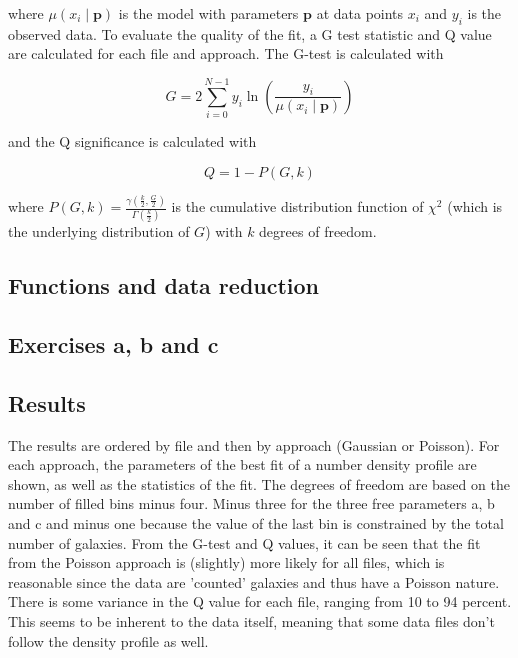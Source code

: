 where $\mu\left(x_{i} \mid \mathbf{p}\right)$ is the model with parameters $\mathbf{p}$ at data points $x_{i}$ and $y_{i}$ is the observed data. To evaluate the quality of the fit, a G test statistic and Q value are calculated for each file and approach. The G-test is calculated with

\begin{equation}
G = 2 \sum_{i=0}^{N-1} y_{i} \ln \left(\frac{y_{i}}{\mu\left(x_{i} \mid \mathbf{p}\right)}\right)
\end{equation}

and the Q significance is calculated with

\begin{equation}
Q = 1 - P(G, k)
\end{equation}

where $P(G, k)=\frac{\gamma\left(\frac{k}{2}, \frac{G}{2}\right)}{\Gamma\left(\frac{k}{2}\right)}$ is the cumulative distribution function of $\chi^{2}$ (which is the underlying distribution of $G$) with $k$ degrees of freedom.

\subsection{Functions and data reduction}



\subsection{Exercises a, b and c}



\subsection{Results}

The results are ordered by file and then by approach (Gaussian or Poisson). For each approach, the parameters of the best fit of a number density profile are shown, as well as the statistics of the fit. The degrees of freedom are based on the number of filled bins minus four. Minus three for the three free parameters a, b and c and minus one because the value of the last bin is constrained by the total number of galaxies. From the G-test and Q values, it can be seen that the fit from the Poisson approach is (slightly) more likely for all files, which is reasonable since the data are 'counted' galaxies and thus have a Poisson nature. There is some variance in the Q value for each file, ranging from 10 to 94 percent. This seems to be inherent to the data itself, meaning that some data files don't follow the density profile as well.

